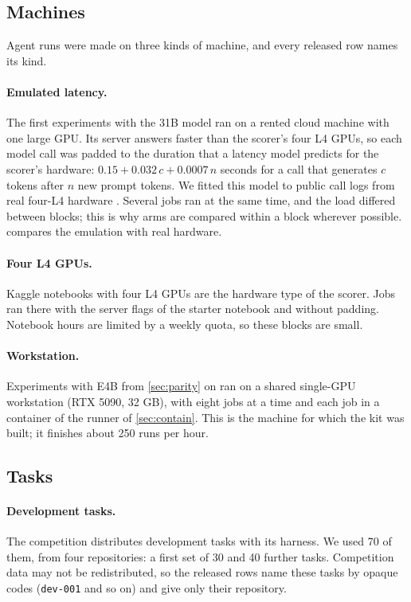 \subsection{Machines}

Agent runs were made on three kinds of machine, and every released row names its kind.

\paragraph{Emulated latency.} The first experiments with the 31B model ran on a rented cloud machine with one large
GPU. Its server answers faster than the scorer's four L4 GPUs, so each model call was padded to the duration that a
latency model predicts for the scorer's hardware: $0.15 + 0.032\,c + 0.0007\,n$ seconds for a call that generates $c$
tokens after $n$ new prompt tokens. We fitted this model to public call logs from real four-L4 hardware
\citep{moshegolderson2026freshswe}. Several jobs ran at the same time, and the load differed between
blocks; this is why arms are compared within a block wherever possible.  compares the emulation with
real hardware.

\paragraph{Four L4 GPUs.} Kaggle notebooks with four L4 GPUs are the hardware type of the scorer. Jobs ran there with the
server flags of the starter notebook and without padding. Notebook hours are limited by a weekly quota, so
these blocks are small.

\paragraph{Workstation.} Experiments with E4B from \cref{sec:parity} on ran on a shared single-GPU workstation
(RTX 5090, 32 GB), with eight jobs at a time and each job in a container of the runner of \cref{sec:contain}. This is
the machine for which the kit was built; it finishes about 250 runs per hour.

\subsection{Tasks}

\paragraph{Development tasks.} The competition distributes development tasks with its harness. We used 70 of them,
from four repositories: a first set of 30 and 40 further tasks.
Competition data may not be redistributed, so the released rows name these tasks by opaque codes
(\texttt{dev-001} and so on) and give only their repository.

